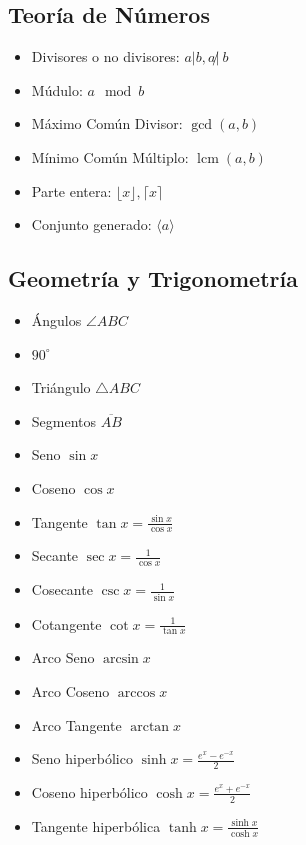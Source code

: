 \documentclass{article}
\DeclareMathOperator{\lcm}{lcm} %
\begin{document}
\subsection{Teoría de Números}
\begin{itemize}
    \item Divisores o no divisores: $a|b, a \not|\ b$
    \item Múdulo: $a\mod b$
    \item Máximo Común Divisor: $\gcd(a,b)$
    \item Mínimo Común Múltiplo: $\lcm(a,b)$
    \item Parte entera: $\lfloor x \rfloor, \lceil x \rceil$
    \item Conjunto generado: $\langle a\rangle$
\end{itemize}


\subsection{Geometría y Trigonometría}
\begin{itemize}
    \item Ángulos $\angle ABC$
    \item $90^{\circ}$
    \item Triángulo $\triangle ABC$
    \item Segmentos $\overline{AB}$
\end{itemize}

\begin{itemize}
    \item Seno $\sin{x}$
    \item Coseno $\cos{x}$
    \item Tangente $\tan{x} = \frac{\sin{x}}{\cos{x}}$
    \item Secante $\sec{x} = \frac{1}{\cos{x}}$
    \item Cosecante $\csc{x} = \frac{1}{\sin{x}}$
    \item Cotangente $\cot{x} = \frac{1}{\tan{x}}$
    \item Arco Seno $\arcsin{x}$
    \item Arco Coseno $\arccos{x}$
    \item Arco Tangente $\arctan{x}$
    \item Seno hiperbólico $\sinh{x} = \frac{e^x-e^{-x}}{2}$
    \item Coseno hiperbólico $\cosh{x} = \frac{e^x+e^{-x}}{2}$
    \item Tangente hiperbólica $\tanh{x} = \frac{\sinh{x}}{\cosh{x}}$
\end{itemize}
\end{document}
